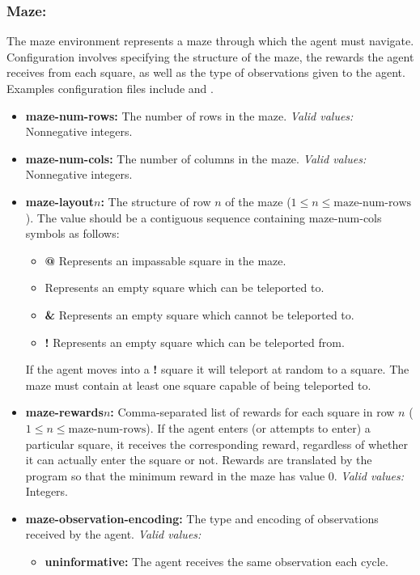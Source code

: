 \documentclass[a4paper,11pt]{article}
\begin{document}
\subsubsection{Maze:}
The maze environment represents a maze through which the agent must navigate. Configuration involves specifying the structure of the maze, the rewards the agent receives from each square, as well as the type of observations given to the agent. Examples configuration files include  and .
\begin{itemize}
\item {\bf maze-num-rows:} The number of rows in the maze. {\em Valid values:} Nonnegative integers.

\item {\bf maze-num-cols:} The number of columns in the maze. {\em Valid values:} Nonnegative integers.

\item {\bf maze-layout$n$:} The structure of row $n$ of the maze ($1 \le n \le \text{maze-num-rows}$). The value should be a contiguous sequence containing maze-num-cols symbols as follows:
  \begin{itemize}
  \item {\bf @} Represents an impassable square in the maze.

  \item {\bf *} Represents an empty square which can be teleported to.

  \item {\bf \&} Represents an empty square which cannot be teleported to.

  \item {\bf !} Represents an empty square which can be teleported from.
  \end{itemize}
  If the agent moves into a {\bf !} square it will teleport at random to a {\bf *} square. The maze must contain at least one square capable of being teleported to.

\item {\bf maze-rewards$n$:} Comma-separated list of rewards for each square in row $n$ ($1 \le n \le \text{maze-num-rows}$). If the agent enters (or attempts to enter) a particular square, it receives the corresponding reward, regardless of whether it can actually enter the square or not. Rewards are translated by the program so that the minimum reward in the maze has value 0. {\em Valid values:} Integers.

\item {\bf maze-observation-encoding:} The type and encoding of observations received by the agent. {\em Valid values:}
  \begin{itemize}
  \item {\bf uninformative:} The agent receives the same observation each cycle.


\end{itemize}
\end{itemize}
\end{document}
